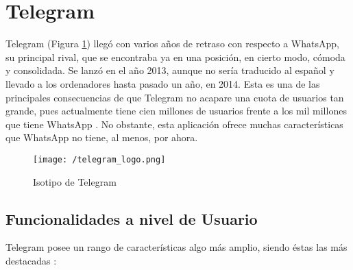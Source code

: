 \clearpage

\section{Telegram}
\label{sec:telegram}

Telegram (Figura \ref{fig:telegram}) llegó con varios años de retraso con respecto a WhatsApp, su principal rival, que se encontraba ya en una posición, en cierto modo, cómoda y consolidada. Se lanzó en el año 2013, aunque no sería traducido al español y llevado a los ordenadores hasta pasado un año, en 2014. Esta es una de las principales consecuencias de que Telegram no acapare una cuota de usuarios tan grande, pues actualmente tiene cien millones de usuarios frente a los mil millones que tiene WhatsApp \cite{Ramirez2017}. No obstante, esta aplicación ofrece muchas características que WhatsApp no tiene, al menos, por ahora.

\begin{figure}[!h]
	\begin{center}
		\texttt{[image: /telegram\_logo.png]}
		\caption{Isotipo de Telegram}
		\label{fig:telegram}
	\end{center}
\end{figure}

\subsection{Funcionalidades a nivel de Usuario}
Telegram posee un rango de características algo más amplio, siendo éstas las más destacadas \cite{Telegram2017}:

